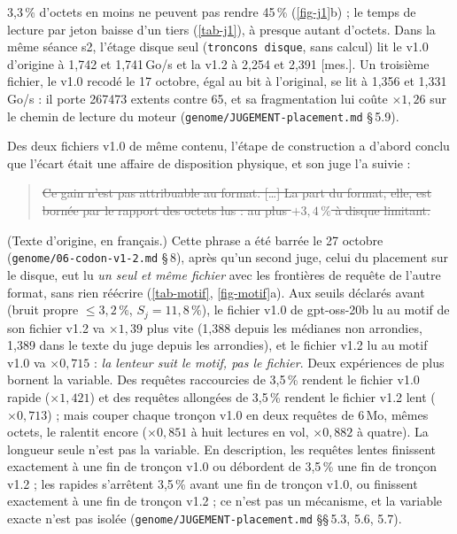 \documentclass[11pt, a4paper]{article}
\theoremstyle{remark}
\newcommand{\etiq}[1]{\textsf{\scriptsize[#1]}}
\newcommand{\mes}{\etiq{mes.}}
\newcommand{\fichier}[1]{\textsf{\footnotesize\nolinkurl{#1}}}
\newcommand{\barre}[1]{\sout{#1}}
\begin{document}
3,3\,\% d'octets en moins ne peuvent pas rendre 45\,\% (\cref{fig-j1}b) ; le temps de lecture par jeton baisse d'un tiers (\cref{tab-j1}), à presque autant d'octets. Dans la même séance s2, l'étage disque seul (\texttt{troncons disque}, sans calcul) lit le v1.0 d'origine à 1,742 et 1,741\,Go/s et la v1.2 à 2,254 et 2,391 \mes. Un troisième fichier, le v1.0 recodé le 17 octobre, égal au bit à l'original, se lit à 1,356 et 1,331\,Go/s : il porte \num{267473} extents contre 65, et sa fragmentation lui coûte $\times 1{,}26$ sur le chemin de lecture du moteur (\fichier{genome/JUGEMENT-placement.md} §\,5.9).

Des deux fichiers v1.0 de même contenu, l'étape de construction a d'abord conclu que l'écart était une affaire de disposition physique, et son juge l'a suivie :
\begin{quote}\small
\barre{Ce gain n'est pas attribuable au format. [\dots] La part du format, elle, est bornée par le rapport des octets lus : au plus $+3{,}4\,\%$ à disque limitant.}
\end{quote}
(Texte d'origine, en français.) Cette phrase a été barrée le 27 octobre (\fichier{genome/06-codon-v1-2.md} §\,8), après qu'un second juge, celui du placement sur le disque, eut lu \emph{un seul et même fichier} avec les frontières de requête de l'autre format, sans rien réécrire (\cref{tab-motif}, \cref{fig-motif}a). Aux seuils déclarés avant (bruit propre $\le 3{,}2\,\%$, $S_j = 11{,}8\,\%$), le fichier v1.0 de gpt-oss-20b lu au motif de son fichier v1.2 va $\times 1{,}39$ plus vite (1,388 depuis les médianes non arrondies, 1,389 dans le texte du juge depuis les arrondies), et le fichier v1.2 lu au motif v1.0 va $\times 0{,}715$ : \emph{la lenteur suit le motif, pas le fichier}. Deux expériences de plus bornent la variable. Des requêtes raccourcies de 3,5\,\% rendent le fichier v1.0 rapide ($\times 1{,}421$) et des requêtes allongées de 3,5\,\% rendent le fichier v1.2 lent ($\times 0{,}713$) ; mais couper chaque tronçon v1.0 en deux requêtes de 6\,Mo, mêmes octets, le ralentit encore ($\times 0{,}851$ à huit lectures en vol, $\times 0{,}882$ à quatre). La longueur seule n'est pas la variable. En description, les requêtes lentes finissent exactement à une fin de tronçon v1.0 ou débordent de 3,5\,\% une fin de tronçon v1.2 ; les rapides s'arrêtent 3,5\,\% avant une fin de tronçon v1.0, ou finissent exactement à une fin de tronçon v1.2 ; ce n'est pas un mécanisme, et la variable exacte n'est pas isolée (\fichier{genome/JUGEMENT-placement.md} §§\,5.3, 5.6, 5.7).
\end{document}

